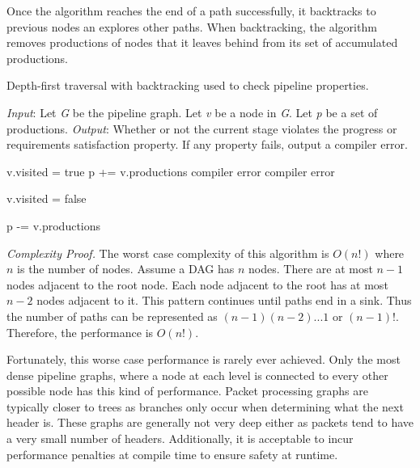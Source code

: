 Once the algorithm reaches the end of a path successfully, it backtracks to previous
nodes an explores other paths. When backtracking, the algorithm removes
productions of nodes that it leaves behind from its set of accumulated productions.

\begin{algorithm}[ht]
 \caption{Depth-first traversal with backtracking used to check pipeline properties.}
 \label{alg:dfs}
 \begin{algorithmic}
 \State
 \State \textit{Input}: Let \textit{G} be the pipeline graph. Let \textit{v} be a node in \textit{G}. Let \textit{p} be a set of productions.
 \State \textit{Output}: Whether or not the current stage violates the progress or requirements satisfaction property. If any property fails, output a compiler error.
 \State

 	\State v.visited = true
 	\State p  += v.productions
 				\State {}
 			\Else
 				\State \Return compiler error
 			\EndIf
 		\EndFor
	\Else
 		\State \Return compiler error
 	\EndIf
 	
	
 	\State v.visited = false 

 	\State p -= v.productions 
 \EndFunction
 \end{algorithmic}

\end{algorithm}


\textit{Complexity Proof.} The worst case complexity of this algorithm is $O(n!)$ where $n$ is the number of nodes. Assume a DAG has $n$ nodes. There are at most $n-1$ nodes adjacent to the root node. Each node adjacent to the root has at most $n-2$ nodes adjacent to it. This pattern continues until paths end in a sink. Thus the number of paths can be represented as $(n-1)(n-2)...1$ or $(n-1)!$. Therefore, the performance
is $O(n!)$.

Fortunately, this worse case performance is rarely ever achieved. Only the most dense pipeline graphs, where a node at each level is connected to every other possible node has this kind of performance. Packet processing graphs are typically closer to trees as branches only occur when determining what the next header is. These graphs are generally not very deep either as packets tend to have a very small number of headers.
Additionally, it is acceptable to incur performance penalties at compile time
to ensure safety at runtime.

